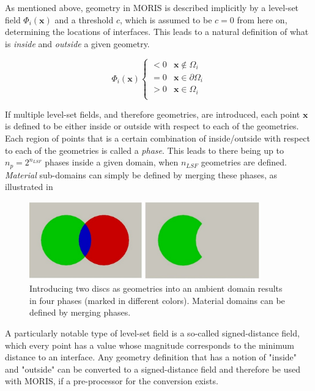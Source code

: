 As mentioned above, geometry in MORIS is described implicitly by a level-set field $\Phi_i(\bm{x})$ and a threshold $c$, which is assumed to be $c=0$ from here on, determining the locations of interfaces. 
This leads to a natural definition of what is \emph{inside} and \emph{outside} a given geometry. 

\begin{equation}
\label{eq:level_set_field}
    \Phi_i(\bm{x}) 
    \begin{cases}
        < 0 & \bm{x} \notin \Omega_i \\
        = 0 & \bm{x} \in \partial\Omega_i \\
        > 0 & \bm{x} \in \Omega_i \\
    \end{cases}
\end{equation}

\hypertarget{phase_assignment}{}
If multiple level-set fields, and therefore geometries, are introduced, each point $\bm{x}$ is defined to be either inside or outside with respect to each of the geometries. Each region of points that is a certain combination of inside/outside with respect to each of the geometries is called a \emph{phase}. This leads to there being up to $n_p = 2^{n_{LSF}}$ phases inside a given domain, when $n_{LSF}$ geometries are defined. \emph{Material} sub-domains can simply be defined by merging these phases, as illustrated in 

\begin{figure}[h]
    \begin{center}
    \includegraphics[width=10cm]{Figures/phase_merging.png}
    \caption{Introducing two discs as geometries into an ambient domain results in four phases (marked in different colors). Material domains can be defined by merging phases. } 
    \label{fig:phase_mergin}
    \end{center}
\end{figure}

A particularly notable type of level-set field is a so-called signed-distance field, which every point has a value whose magnitude corresponds to the minimum distance to an interface.
Any geometry definition that has a notion of "inside" and "outside" can be converted to a signed-distance field and therefore be used with MORIS, if a pre-processor for the conversion exists.

